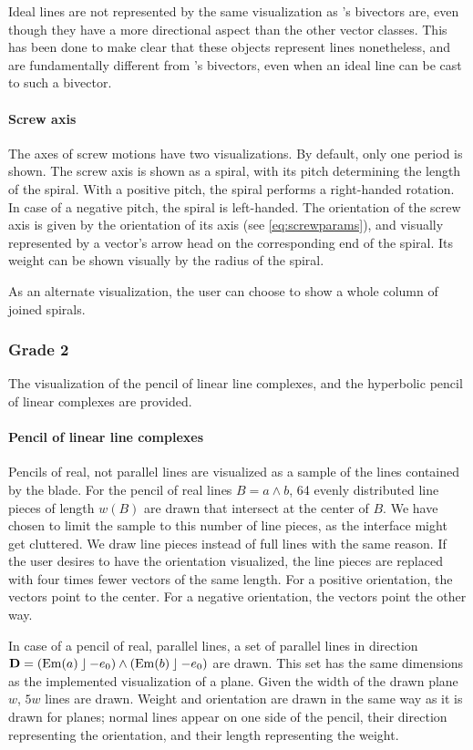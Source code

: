 Ideal lines are not represented by the same visualization as \ega's bivectors are, even though they have a more directional aspect than the other vector classes.  This has been done to make clear that these objects represent lines nonetheless, and are fundamentally different from \ega's bivectors, even when an ideal line can be cast to such a bivector.

\paragraph{Screw axis}
The axes of screw motions have two visualizations.  By default, only one period is shown.  The screw axis is shown as a spiral, with its pitch determining the length of the spiral.  With a positive pitch, the spiral performs a right-handed rotation.  In case of a negative pitch, the spiral is left-handed.  The orientation of the screw axis is given by the orientation of its axis (see \autoref{eq:screwparams}), and visually represented by a vector's arrow head on the corresponding end of the spiral.  
Its weight can be shown visually by the radius of the spiral.

As an alternate visualization, the user can choose to show a whole column of joined spirals.

\subsubsection{Grade 2}
The visualization of the pencil of linear line complexes, and the hyperbolic pencil of linear complexes are provided. 

\paragraph{Pencil of linear line complexes}
Pencils of real, not parallel lines are visualized as a sample of the lines contained by the blade.  For the pencil of real lines $B = a \wedge b$, 64 evenly distributed line pieces of length $w(B)$ are drawn that intersect at the center of $B$.  We have chosen to limit the sample to this number of line pieces, as the interface might get cluttered.  We draw line pieces instead of full lines with the same reason.  If the user desires to have the orientation visualized, the line pieces are replaced with four times fewer vectors of the same length.  For a positive orientation, the vectors point to the center.  For a negative orientation, the vectors point the other way.

In case of a pencil of real, parallel lines, a set of parallel lines in direction $\mathbf{D} = (\operatorname{Em}(a) \mathbin{\rfloor} -e_0) \wedge (\operatorname{Em}(b) \mathbin{\rfloor} -e_0)$ are drawn.  This set has the same dimensions as the implemented visualization of a plane.  Given the width of the drawn plane $w$, $5w$ lines are drawn.  Weight and orientation are drawn in the same way as it is drawn for planes; normal lines appear on one side of the pencil, their direction representing the orientation, and their length representing the weight.

